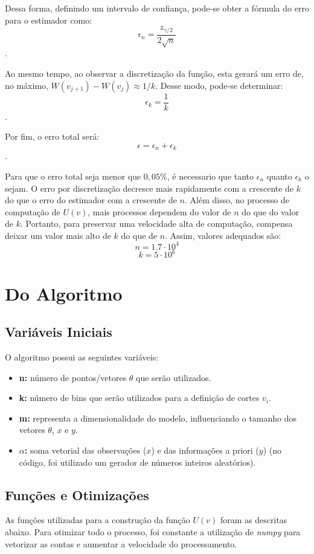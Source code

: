 \documentclass{article}
\begin{document}
Dessa forma, definindo um intervalo de confiança, pode-se obter a fórmula do erro para o estimador como: $$\epsilon_n = \frac{z_{\gamma/2}}{2\sqrt{n}}$$.

Ao mesmo tempo, ao observar a discretização da função, esta gerará um erro de, no máximo, $W(v_{j + 1}) - W(v_j) \approx 1/k$. Desse modo, pode-se determinar: $$\epsilon_k = \frac{1}{k}$$.

Por fim, o erro total será: $$\epsilon = \epsilon_n + \epsilon_k$$.

Para que o erro total seja menor que $0,05\%$, é necessario que tanto $\epsilon_n$ quanto $\epsilon_k$ o sejam. O erro por discretização decresce mais rapidamente com a crescente de $k$ do que o erro do estimador com a crescente de $n$. Além disso, no processo de computação de $U(v)$, mais processos dependem do valor de $n$ do que do valor de $k$. Portanto, para preservar uma velocidade alta de computação, compensa deixar um valor mais alto de $k$ do que de $n$. Assim, valores adequados são: $$n = 1.7 \cdot 10^4$$ $$k = 5 \cdot 10^6$$

\section{Do Algoritmo}
\subsection{Variáveis Iniciais}
O algoritmo possui as seguintes variáveis:

\begin{itemize}
    \item \textbf{n:} número de pontos/vetores $\theta$ que serão utilizados.
    \item \textbf{k:} número de bins que serão utilizados para a definição de cortes $v_i$.
    \item \textbf{m:} representa a dimensionalidade do modelo, influenciando o tamanho dos vetores $\theta$, $x$ e $y$.
    \item \textbf{$\alpha$:} soma vetorial das observações ($x$) e das informações a priori ($y$) (no código, foi utilizado um gerador de números inteiros aleatórios).
\end{itemize}

\subsection{Funções e Otimizações}
As funções utilizadas para a construção da função $U(v)$ foram as descritas abaixo. Para otimizar todo o processo, foi constante a utilização de \textit{numpy} para vetorizar as contas e aumentar a velocidade do processamento.
\end{document}

